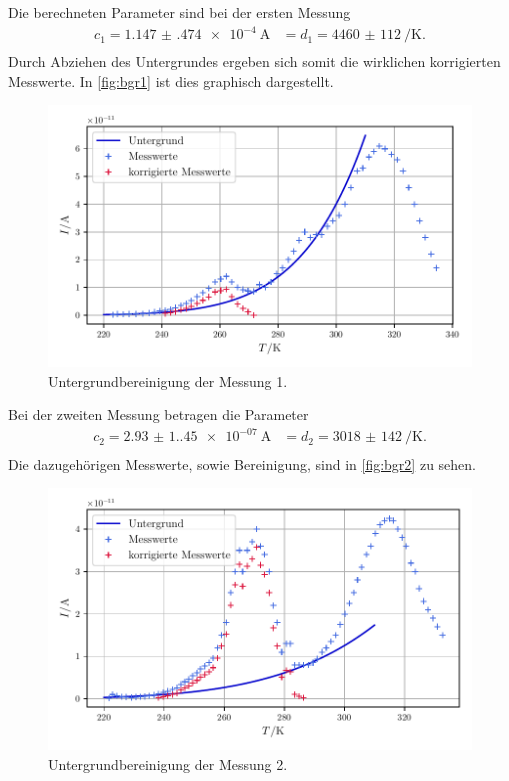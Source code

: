 Die berechneten Parameter sind bei der ersten Messung
\begin{align}
    c_1 = \qty{1.147(474)e-4}{\ampere} &= d_1 = \qty{4460(112)}{\per\kelvin}.\\
\end{align}
Durch Abziehen des Untergrundes ergeben sich somit die wirklichen korrigierten Messwerte.
In \autoref{fig:bgr1} ist dies graphisch dargestellt.
\begin{figure}
    \centering
    \includegraphics[width=0.8\linewidth]{scripts/build/plot1_bgr.pdf}
    \caption{Untergrundbereinigung der Messung 1.}%
    \label{fig:bgr1}
\end{figure}

Bei der zweiten Messung betragen die Parameter
\begin{align}
    c_2 = \qty{2.93(1.45)e-07}{\ampere} &= d_2 = \qty{3018(142)}{\per\kelvin}.\\
\end{align}
Die dazugehörigen Messwerte, sowie Bereinigung, sind in \autoref{fig:bgr2} zu sehen.
\begin{figure}
    \centering
    \includegraphics[width=0.8\linewidth]{scripts/build/plot2_bgr.pdf}
    \caption{Untergrundbereinigung der Messung 2.}%
    \label{fig:bgr2}
\end{figure}

